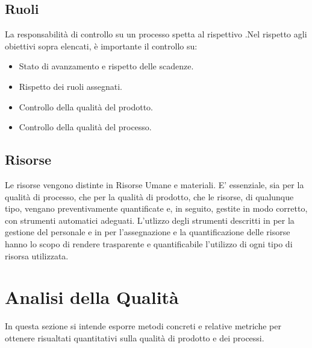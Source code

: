 \documentclass[12pt,a4paper]{article}
\begin{document}
\subsection{Ruoli}
La responsabilità di controllo su un processo spetta al rispettivo \PM{}.Nel rispetto agli obiettivi sopra elencati, è importante il controllo su:
\begin{itemize}
	\item Stato di avanzamento e rispetto delle scadenze.
	\item Rispetto dei ruoli assegnati.
	\item Controllo della qualità del prodotto.
	\item Controllo della qualità del processo. 
\end{itemize}

\subsection{Risorse}
Le risorse vengono distinte in Risorse Umane e materiali. E' essenziale, sia per la qualità di processo, che per la qualità di prodotto, che le risorse, di qualunque tipo, vengano preventivamente quantificate e, in seguito, gestite in modo corretto, con strumenti automatici adeguati.
L'utlizzo degli strumenti descritti in \NdP{} per la gestione del personale e in \PdP{} per l'assegnazione e la quantificazione delle risorse hanno lo scopo di rendere trasparente e quantificabile l'utilizzo di ogni tipo di risorsa utilizzata.

\section{Analisi della Qualità}\label{analisi}
In questa sezione si intende esporre metodi concreti e relative metriche per ottenere risualtati quantitativi sulla qualità di prodotto e dei processi. 
\end{document}
